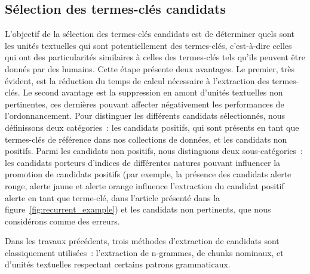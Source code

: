   \subsection{Sélection des termes-clés candidats}
  \label{subsec:extraction_de_termes_cles_candidats}
    L'objectif de la sélection des termes-clés candidats est de déterminer quels
    sont les unités textuelles qui sont potentiellement des termes-clés,
    c'est-à-dire celles qui ont des particularités similaires à celles des
    termes-clés tels qu'ils peuvent être donnés par des humains. Cette étape
    présente deux avantages. Le premier, très évident, est la réduction du temps
    de calcul nécessaire à l'extraction des termes-clés. Le second avantage est
    la suppression en amont d'unités textuelles non pertinentes, ces dernières
    pouvant affecter négativement les performances de l'ordonnancement. Pour
    distinguer les différents candidats sélectionnés, nous définissons deux
    catégories~: les candidats positifs, qui sont présents en tant que
    termes-clés de référence dans nos collections de données, et les candidats
    non positifs. Parmi les candidats non positifs, nous distinguons deux
    sous-catégories~: les candidats porteurs d'indices de différentes natures
    pouvant influencer la promotion de candidats positifs (par exemple, la
    présence des candidats \og{}alerte rouge\fg{}, \og{}alerte jaune\fg{} et
    \og{}alerte orange\fg{} influence l'extraction du candidat positif
    \og{}alerte\fg{} en tant que terme-clé, dans l'article présenté dans la
    figure~\ref{fig:recurrent_example}) et les candidats non pertinents, que
    nous considérons comme des erreurs.

    Dans les travaux précédents, trois méthodes d'extraction de candidats sont
    classiquement utilisées~: l'extraction de n-grammes, de chunks nominaux, et
    d'unités textuelles respectant certains patrons grammaticaux. 

